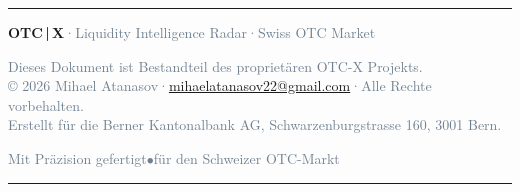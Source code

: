 \documentclass[11pt, a4paper, oneside, openany]{report}
\begin{document}
\begin{center}
{\color{SwissRed}\rule{0.5\textwidth}{1pt}}

\vspace{0.6cm}
{\sffamily\textcolor{DeepNavy}{\textbf{OTC\,|\,X}}\;\textcolor{SlateGrey}{·\;Liquidity Intelligence Radar\;·\;Swiss OTC Market}}

\vspace{0.3cm}
{\small\sffamily\textcolor{SlateGrey}{Dieses Dokument ist Bestandteil des proprietären OTC-X Projekts.}}\\[3pt]
{\small\sffamily\textcolor{SlateGrey}{\copyright{} 2026 Mihael Atanasov\;·\;\href{mailto:mihaelatanasov22@gmail.com}{mihaelatanasov22@gmail.com}\;·\;Alle Rechte vorbehalten.}}\\[3pt]
{\small\sffamily\textcolor{SlateGrey}{Erstellt für die Berner Kantonalbank AG, Schwarzenburgstrasse 160, 3001 Bern.}}

\vspace{0.3cm}
{\footnotesize\sffamily\textcolor{SlateGrey}{Mit Präzision gefertigt\;\;$\bullet$\;\;für den Schweizer OTC-Markt}}

\vspace{0.5cm}
{\color{SwissRed}\rule{0.5\textwidth}{1pt}}
\end{center}
\end{document}

